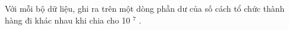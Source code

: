 Với mỗi bộ dữ liệu, ghi ra trên một dòng phần dư của số cách tổ chức thành hàng đi khác nhau khi chia cho 10 $^ 7 $ .

\
